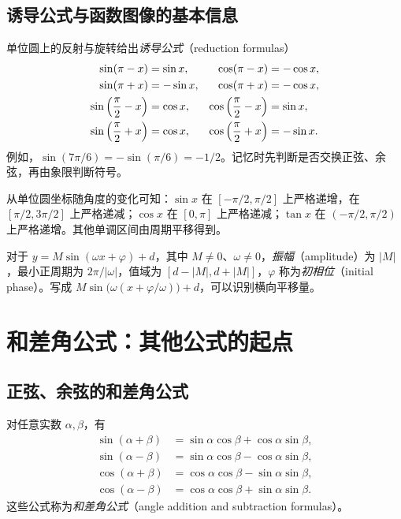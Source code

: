 \documentclass[UTF8,12pt,a4paper,fontset=fandol]{ctexart}
\begin{document}
\subsection{诱导公式与函数图像的基本信息}

单位圆上的反射与旋转给出\emph{诱导公式}（reduction formulas）
\begin{align}
  \sin(\pi-x)&=\sin x,&\cos(\pi-x)&=-\cos x,\label{eq:trig-supplement}\\
  \sin(\pi+x)&=-\sin x,&\cos(\pi+x)&=-\cos x,\notag\\
  \sin\left(\frac\pi2-x\right)&=\cos x,&
  \cos\left(\frac\pi2-x\right)&=\sin x,\notag\\
  \sin\left(\frac\pi2+x\right)&=\cos x,&
  \cos\left(\frac\pi2+x\right)&=-\sin x.\notag
\end{align}
例如，$\sin(7\pi/6)=-\sin(\pi/6)=-1/2$。记忆时先判断是否交换正弦、余弦，再由象限判断符号。

从单位圆坐标随角度的变化可知：$\sin x$ 在 $[-\pi/2,\pi/2]$ 上严格递增，在 $[\pi/2,3\pi/2]$ 上严格递减；$\cos x$ 在 $[0,\pi]$ 上严格递减；$\tan x$ 在 $(-\pi/2,\pi/2)$ 上严格递增。其他单调区间由周期平移得到。

对于 $y=M\sin(\omega x+\varphi)+d$，其中 $M\ne0$、$\omega\ne0$，\emph{振幅}（amplitude）为 $|M|$，最小正周期为 $2\pi/|\omega|$，值域为 $[d-|M|,d+|M|]$，$\varphi$ 称为\emph{初相位}（initial phase）。写成 $M\sin\bigl(\omega(x+\varphi/\omega)\bigr)+d$，可以识别横向平移量。

\section{和差角公式：其他公式的起点}
\label{sec:trig-addition}

\subsection{正弦、余弦的和差角公式}

\begin{theorem}[和差角公式]
对任意实数 $\alpha,\beta$，有
\begin{align}
  \sin(\alpha+\beta)&=\sin\alpha\cos\beta+\cos\alpha\sin\beta,\label{eq:trig-sin-add}\\
  \sin(\alpha-\beta)&=\sin\alpha\cos\beta-\cos\alpha\sin\beta,\label{eq:trig-sin-sub}\\
  \cos(\alpha+\beta)&=\cos\alpha\cos\beta-\sin\alpha\sin\beta,\label{eq:trig-cos-add}\\
  \cos(\alpha-\beta)&=\cos\alpha\cos\beta+\sin\alpha\sin\beta.\label{eq:trig-cos-sub}
\end{align}
这些公式称为\emph{和差角公式}（angle addition and subtraction formulas）。
\end{theorem}
\end{document}
